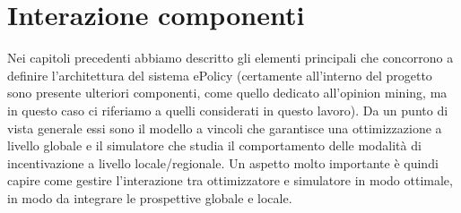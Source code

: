 








%
\clearpage{\pagestyle{empty}\cleardoublepage}
\chapter{\nohyphens{Interazione componenti}}
Nei capitoli precedenti abbiamo descritto gli elementi principali che concorrono a definire l'architettura del sistema ePolicy (certamente all'interno del progetto sono presente ulteriori componenti, come quello dedicato all'opinion mining, ma in questo caso ci riferiamo a quelli considerati in questo lavoro). Da un punto di vista generale essi sono il modello a vincoli che garantisce una ottimizzazione a livello globale e il simulatore che studia il comportamento delle modalità di incentivazione a livello locale/regionale. Un aspetto molto importante è quindi capire come gestire l'interazione tra ottimizzatore e simulatore in modo ottimale, in modo da integrare le prospettive globale e locale.

